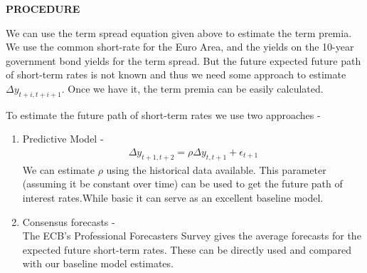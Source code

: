 \documentclass[
]{article}
\begin{document}
\textbf{PROCEDURE}

We can use the term spread equation given above to estimate the term
premia. We use the common short-rate for the Euro Area, and the yields
on the 10-year government bond yields for the term spread. But the
future expected future path of short-term rates is not known and thus we
need some approach to estimate \(\Delta y_{t+i,t+i+1}\). Once we have
it, the term premia can be easily calculated.

To estimate the future path of short-term rates we use two approaches -

\begin{enumerate}
\def\labelenumi{\arabic{enumi}.}
\item
  Predictive Model - \begin{eqnarray*}
  \Delta y_{t+1,t+2} = \rho\Delta y_{t,t+1} + \epsilon_{t+1}
  \end{eqnarray*} We can estimate \(\rho\) using the historical data
  available. This parameter (assuming it be constant over time) can be
  used to get the future path of interest rates.While basic it can serve
  as an excellent baseline model.
\item
  Consensus forecasts -\\
  The ECB's Professional Forecasters Survey gives the average forecasts
  for the expected future short-term rates. These can be directly used
  and compared with our baseline model estimates.
\end{enumerate}
\end{document}
